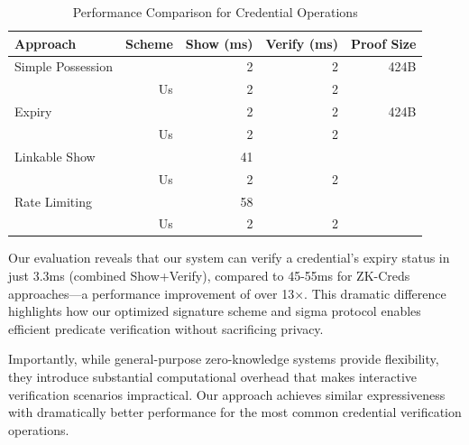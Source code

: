 \begin{table}[htbp]
\centering
\caption{Performance Comparison for Credential Operations}
\label{tab:expiry-comparison}
\begin{tabular}{lrrrr}
\toprule
\textbf{Approach} & \textbf{Scheme} & \textbf{Show (ms)} & \textbf{Verify (ms)} & \textbf{Proof Size} \\
\midrule
Simple Possession & \cite{rosenberg_zk-creds_2022} & 2 & 2 & 424B \\
& Us & 2 & 2 & \\
\midrule
Expiry & \cite{rosenberg_zk-creds_2022} & 2 & 2 & 424B \\
& Us & 2 & 2 & \\
\midrule
Linkable Show & \cite{rosenberg_zk-creds_2022} & 41 &  &  \\
& Us & 2 & 2 & \\
\midrule
Rate Limiting & \cite{rosenberg_zk-creds_2022} & 58 &  &  \\
& Us & 2 & 2 & \\
\bottomrule
\end{tabular}
\end{table}

Our evaluation reveals that our system can verify a credential's expiry status in just 3.3ms (combined Show+Verify), compared to 45-55ms for ZK-Creds approaches—a performance improvement of over 13×. This dramatic difference highlights how our optimized signature scheme and sigma protocol enables efficient predicate verification without sacrificing privacy.

Importantly, while general-purpose zero-knowledge systems provide flexibility, they introduce substantial computational overhead that makes interactive verification scenarios impractical. Our approach achieves similar expressiveness with dramatically better performance for the most common credential verification operations.























